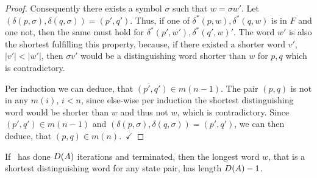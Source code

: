 \begin{proof}
	Consequently there exists a symbol $\sigma$ such that $w = \sigma w'$. Let $(\delta(p,\sigma),\delta(q,\sigma)) = (p',q')$. Thus, if one of $\delta^*(p, w),\delta^*(q, w)$ is in $F$ and one not, then the same must hold for $\delta^*(p', w'),\delta^*(q', w)'$. The word $w'$ is also the shortest fulfilling this property, because, if there existed a shorter word $v'$, $|v'| < |w'|$, then $\sigma v'$ would be a distinguishing word shorter than $w$ for $p,q$ which is contradictory.
	
	Per induction we can deduce, that $(p',q')\in m(n-1)$. The pair $(p,q)$ is not in any $m(i)$, $i<n$, since else-wise per induction the shortest distinguishing word would be shorter than $w$ and thus not $w$, which is contradictory. Since $(p',q')\in m(n-1)$ and $(\delta(p,\sigma),\delta(q,\sigma)) = (p',q')$, we can then deduce, that $(p,q)\in m(n)$.\ $\checkmark$ 
\end{proof}

\begin{lemma}\label{ch:3:semantics-of-D(A)}
    If \CompDist\ has done $D(A)$ iterations and terminated, then the longest word $w$, that is a shortest distinguishing word for any state pair, has length $D(A)-1$.
\end{lemma}

